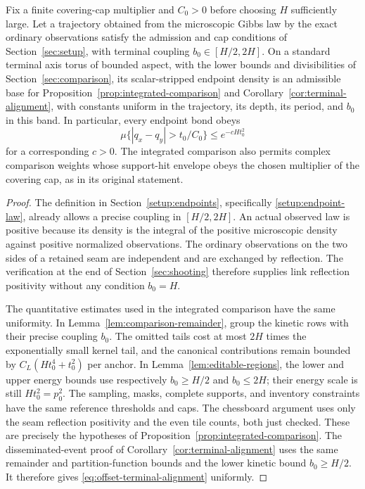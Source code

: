\begin{lemma}
\label{lem:band-endpoints}
Fix a finite covering-cap multiplier and $C_0>0$ before choosing $H$
sufficiently large.  Let a trajectory obtained from the microscopic
Gibbs law by the exact ordinary observations satisfy the admission and
cap conditions of Section~\ref{sec:setup}, with terminal coupling
$b_0\in[H/2,2H]$.  On a standard terminal axis torus of bounded
aspect, with the lower bounds and divisibilities of
Section~\ref{sec:comparison}, its scalar-stripped endpoint density
is an admissible base for Proposition~\ref{prop:integrated-comparison}
and Corollary~\ref{cor:terminal-alignment}, with constants uniform in
the trajectory, its depth, its period, and $b_0$ in this band.
In particular, every endpoint bond obeys
\begin{equation}
 \mu\{|q_x-q_y|>t_0/C_0\}\le e^{-cHt_0^2}
 \label{eq:offset-terminal-alignment}
\end{equation}
for a corresponding $c>0$.
The integrated comparison also permits complex comparison weights
whose support-hit envelope obeys the chosen multiplier of the covering
cap, as in its original statement.
\end{lemma}

\begin{proof}
The definition in Section~\ref{setup:endpoints}, specifically
\eqref{setup:endpoint-law}, already allows a precise coupling in
$[H/2,2H]$.  An actual observed law is positive because its density
is the integral of the positive microscopic density against positive
normalized observations.  The ordinary observations on the two
sides of a retained seam are independent and are exchanged by
reflection.  The verification at the end of
Section~\ref{sec:shooting} therefore supplies link reflection
positivity without any condition $b_0=H$.

The quantitative estimates used in the integrated comparison have
the same uniformity.  In Lemma~\ref{lem:comparison-remainder},
group the kinetic rows with their precise coupling $b_0$.  The omitted
tails cost at most $2H$ times the exponentially small kernel tail,
and the canonical contributions remain bounded by
$C_L(Ht_0^4+t_0^2)$ per anchor.  In
Lemma~\ref{lem:editable-regions}, the lower and upper energy bounds
use respectively $b_0\ge H/2$ and $b_0\le2H$; their energy scale is
still $Ht_0^2=p_0^2$.  The sampling, masks, complete supports, and
inventory constraints have the same reference thresholds and caps.
The chessboard argument uses only the seam reflection positivity and
the even tile counts, both just checked.  These are precisely the
hypotheses of Proposition~\ref{prop:integrated-comparison}.
The disseminated-event proof of
Corollary~\ref{cor:terminal-alignment} uses the same remainder and
partition-function bounds and the lower kinetic bound $b_0\ge H/2$.
It therefore gives \eqref{eq:offset-terminal-alignment} uniformly.
\end{proof}

